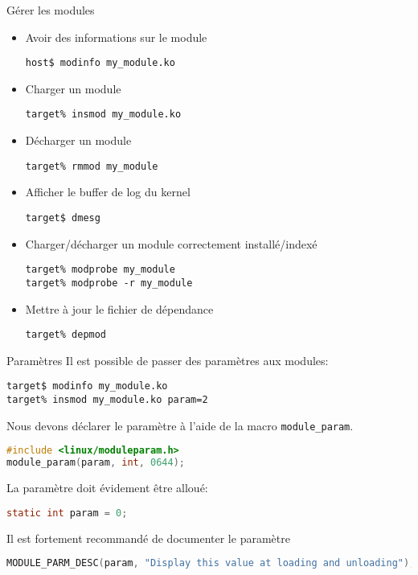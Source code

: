 \begin{frame}[fragile=singleslide]{Gérer les modules}
  \begin{itemize} 
  \item Avoir des informations sur le module
    \begin{lstlisting}
host$ modinfo my_module.ko
    \end{lstlisting} %
  \item Charger un module
    \begin{lstlisting}
target% insmod my_module.ko
    \end{lstlisting} %
  \item Décharger un module
    \begin{lstlisting}
target% rmmod my_module
    \end{lstlisting}%
  \item Afficher le buffer de log du kernel
    \begin{lstlisting}
target$ dmesg
    \end{lstlisting} %
  \item Charger/décharger un module correctement installé/indexé
    \begin{lstlisting}
target% modprobe my_module
target% modprobe -r my_module
    \end{lstlisting} %
  \item Mettre à jour le fichier de dépendance
    \begin{lstlisting} 
target% depmod
    \end{lstlisting} %
  \end{itemize}
\end{frame}

\begin{frame}[fragile=singleslide]{Paramètres}
  Il est possible de passer des paramètres aux modules:
  \begin{lstlisting}
target$ modinfo my_module.ko 
target% insmod my_module.ko param=2  
  \end{lstlisting} %
  Nous   devons  déclarer   le  paramètre   à  l'aide   de   la  macro
  \texttt{module\_param}.
  \begin{lstlisting}[language=c]
#include <linux/moduleparam.h>
module_param(param, int, 0644);
  \end{lstlisting} 
  La paramètre doit évidement être alloué:
  \begin{lstlisting}[language=c]
static int param = 0;
  \end{lstlisting} 
  Il est fortement recommandé de documenter le paramètre
  \begin{lstlisting}[language=c]
MODULE_PARM_DESC(param, "Display this value at loading and unloading");
  \end{lstlisting} 
\end{frame}

